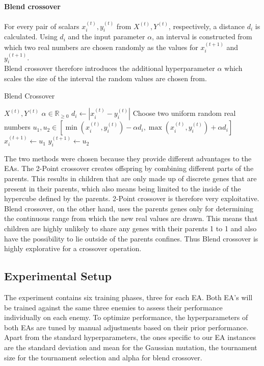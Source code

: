 \paragraph{Blend crossover}
For every pair of scalars $x_i^{(t)}, y_i^{(t)}$ from $X^{(t)}, Y^{(t)}$, respectively, a distance $d_i$ is calculated.
Using $d_i$ and the input parameter $\alpha$, an interval is constructed from which two real numbers are chosen randomly as the values for $x_i^{(t+1)}$ and $y_i^{(t+1)}$. \\
Blend crossover therefore introduces the additional hyperparameter $\alpha$ which scales the size of the interval the random values are chosen from.
\begin{algorithm}
\caption{Blend Crossover}\label{alg:blendx}
\begin{algorithmic}

\Require $X^{(t)}, Y^{(t)}$
\Ensure $\alpha \in \mathbb{R}_{\geq 0}$
    \State $d_i \gets |x_i^{(t)} -  y_i^{(t)}|$
    \State Choose two uniform random real numbers
    \State $u_1, u_2 \in [\min(x_i^{(t)}, y_i^{(t)}) - \alpha d_i, \max(x_i^{(t)}, y_i^{(t)}) + \alpha d_i]$
    \State $x_i^{(t+1)} \gets u_1$
    \State $y_i^{(t+1)} \gets u_2$
\EndFor

\end{algorithmic}
\end{algorithm}

The two methods were chosen because they provide different advantages to the EAs. 
The 2-Point crossover creates offspring by combining different parts of the parents. 
This results in children that are only made up of discrete genes that are present in their parents, which also means being limited to the inside of the hypercube defined by the parents. 
2-Point crossover is therefore very exploitative.
Blend crossover, on the other hand, uses the parents genes only for determining the continuous range from which the new real values are drawn. 
This means that children are highly unlikely to share any genes with their parents 1 to 1 and also have the possibility to lie outside of the parents confines. 
Thus Blend crossover is highly explorative for a crossover operation.

\subsection{Experimental Setup}
The experiment contains six training phases, three for each EA.
Both EA’s will be trained against the same three enemies to assess their performance individually on each enemy.
To optimize performance, the hyperparameters of both EAs are tuned by manual adjustments based on their prior performance.
Apart from the standard hyperparameters, the ones specific to our EA instances are the standard deviation and mean for the Gaussian mutation, the tournament size for the tournament selection and alpha for blend crossover.

